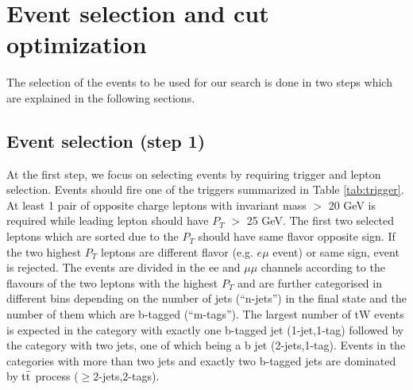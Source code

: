 \clearpage
\section{Event selection and cut optimization}
\label{tW_Eventselection}
The selection of the events to be used for our search is done in two steps which are explained in the following sections.
\subsection{Event selection (step 1)}
\label{step1_selection}
At the first step, we focus on selecting events by requiring trigger and lepton selection. Events should fire one of the triggers summarized in Table \ref{tab:trigger}.
At least 1 pair of opposite charge leptons with invariant mass $>$ 20 GeV is required while leading lepton should have $P_{T}$ $>$ 25 GeV.
The first two selected leptons which are sorted due to the $P_{T}$ should have same flavor opposite sign. If the two highest $P_{T}$ leptons are different flavor (e.g. $e\mu$ event) or same sign, event is rejected.
The events are divided in the ee and $\mu\mu$ channels according to the flavours of the two leptons with the highest $P_{T}$
and are further categorised in different bins depending on the number of jets (``n-jets'') in the final state and the number of them which are b-tagged (``m-tags'').
The largest number of  tW events is expected in the category with exactly one  b-tagged jet (1-jet,1-tag) followed by the category with two jets, one of which being a  b jet (2-jets,1-tag). Events in the categories with more than  two jets and exactly two b-tagged jets  are dominated by $\mathrm{t\bar{t}}$ process ($\geq$2-jets,2-tags).

%
%

